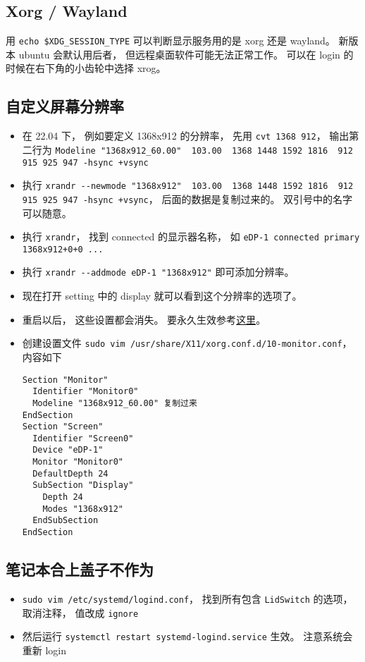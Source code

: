 \subsection{Xorg / Wayland}
用 \verb|echo $XDG_SESSION_TYPE| 可以判断显示服务用的是 xorg 还是 wayland。 新版本 ubuntu 会默认用后者， 但远程桌面软件可能无法正常工作。 可以在 login 的时候在右下角的小齿轮中选择 xrog。

\subsection{自定义屏幕分辨率}
\begin{itemize}
\item 在 22.04 下， 例如要定义 1368x912 的分辨率， 先用 \verb|cvt 1368 912|， 输出第二行为 \verb|Modeline "1368x912_60.00"  103.00  1368 1448 1592 1816  912 915 925 947 -hsync +vsync|
\item 执行 \verb|xrandr --newmode "1368x912"  103.00  1368 1448 1592 1816  912 915 925 947 -hsync +vsync|， 后面的数据是复制过来的。 双引号中的名字可以随意。
\item 执行 \verb|xrandr|， 找到 connected 的显示器名称， 如 \verb|eDP-1 connected primary 1368x912+0+0 ...|
\item 执行 \verb|xrandr --addmode eDP-1 "1368x912"| 即可添加分辨率。
\item 现在打开 setting 中的 display 就可以看到这个分辨率的选项了。
\item 重启以后， 这些设置都会消失。 要永久生效参考\href{https://askubuntu.com/questions/1376391/how-to-permanently-save-an-xrandr-configuration-for-a-monitor-even-after-reboot}{这里}。
\item 创建设置文件 \verb|sudo vim /usr/share/X11/xorg.conf.d/10-monitor.conf|， 内容如下
\begin{lstlisting}[language=none]
Section "Monitor"
  Identifier "Monitor0"
  Modeline "1368x912_60.00" 复制过来
EndSection
Section "Screen"
  Identifier "Screen0"
  Device "eDP-1"
  Monitor "Monitor0"
  DefaultDepth 24
  SubSection "Display"
    Depth 24
    Modes "1368x912"
  EndSubSection
EndSection
\end{lstlisting}
\end{itemize}


\subsection{笔记本合上盖子不作为}
\begin{itemize}
\item \verb|sudo vim /etc/systemd/logind.conf|， 找到所有包含 \verb|LidSwitch| 的选项， 取消注释， 值改成 \verb|ignore|
\item 然后运行 \verb|systemctl restart systemd-logind.service| 生效。 注意系统会重新 login
\end{itemize}

